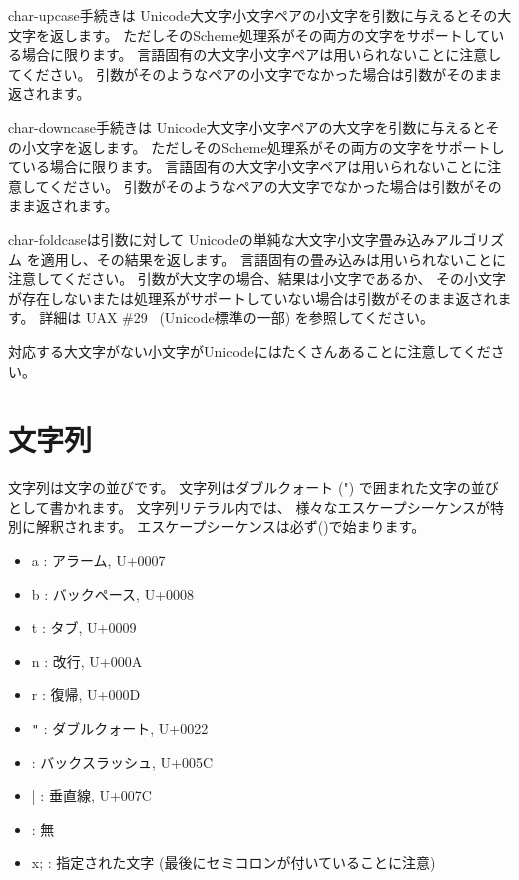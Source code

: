 \begin{entry}{%
}


{\cf char-upcase}手続きは
Unicode大文字小文字ペアの小文字を引数に与えるとその大文字を返します。
ただしそのScheme処理系がその両方の文字をサポートしている場合に限ります。
言語固有の大文字小文字ペアは用いられないことに注意してください。
引数がそのようなペアの小文字でなかった場合は引数がそのまま返されます。

{\cf char-downcase}手続きは
Unicode大文字小文字ペアの大文字を引数に与えるとその小文字を返します。
ただしそのScheme処理系がその両方の文字をサポートしている場合に限ります。
言語固有の大文字小文字ペアは用いられないことに注意してください。
引数がそのようなペアの大文字でなかった場合は引数がそのまま返されます。

{\cf char-foldcase}は引数に対して
Unicodeの単純な大文字小文字畳み込みアルゴリズム
を適用し、その結果を返します。
言語固有の畳み込みは用いられないことに注意してください。
引数が大文字の場合、結果は小文字であるか、
その小文字が存在しないまたは処理系がサポートしていない場合は引数がそのまま返されます。
詳細は UAX \#29~\cite{uax29} (Unicode標準の一部) を参照してください。

対応する大文字がない小文字がUnicodeにはたくさんあることに注意してください。

\end{entry}


\section{文字列}
\label{stringsection}

文字列は文字の並びです。
\vest 文字列はダブルクォート ({\cf "}) で囲まれた文字の並びとして書かれます。
文字列リテラル内では、
様々なエスケープシーケンスが特別に解釈されます。
エスケープシーケンスは必ず(\backwhack{})で始まります。

\begin{itemize}
\item{\cf\backwhack{}a} : アラーム, U+0007
\item{\cf\backwhack{}b} : バックペース, U+0008 
\item{\cf\backwhack{}t} : タブ, U+0009 
\item{\cf\backwhack{}n} : 改行, U+000A 
\item{\cf\backwhack{}r} : 復帰, U+000D 
\item{\cf\backwhack{}}\verb|"| : ダブルクォート, U+0022 
\item{\cf\backwhack{}\backwhack{}} : バックスラッシュ, U+005C 
\item{\cf\backwhack{}|} : 垂直線, U+007C
\item{\cf\backwhack{}
      } : 無
\item{\cf\backwhack{}x;} : 指定された文字
(最後にセミコロンが付いていることに注意)
\end{itemize}

